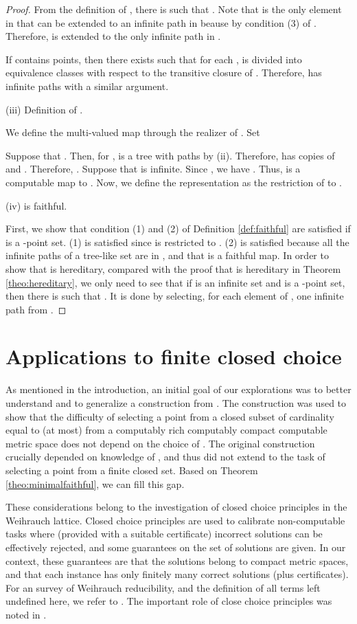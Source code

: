 \documentclass{eptcs-modified}
\begin{document}
\begin{theorem}
\begin{proof}
From the definition of ,  there is  such that .
Note that  is the only element in  that can be extended to an infinite path in 
beause  by condition (3) of .
Therefore,  is extended to the only infinite path in .


If  contains  points, then there exists  such that for each ,
 is divided into  equivalence classes  with respect to the transitive closure of .  Therefore,  has  infinite paths with a similar argument.


(iii) Definition of .

We define the multi-valued map  through  the realizer of .  Set


Suppose that .  Then, for ,   is a tree with  paths by (ii).  Therefore,  has  copies of  and .   Therefore, .
Suppose that  is infinite. Since , we have .
Thus,  is a computable map to .
Now, we define the representation  as the restriction of  to .

(iv)  is faithful.

First, we show that
condition (1) and (2) of  Definition \ref{def:faithful} are satisfied
if  is a -point set.
(1) is satisfied since  is restricted to  .
(2) is satisfied because all the infinite paths of a tree-like set  are in , and
that  is a faithful map.
In order to show that  is hereditary, compared with the proof that
 is hereditary in Theorem \ref{theo:hereditary},
we only need to see that if  is an infinite set and  is a -point set, then there is  such that .
It is done by selecting, for each element of ,  one infinite path from .
\end{proof}
\end{theorem}


\section{Applications to finite closed choice}
\label{sec:weihrauch}
As mentioned in the introduction, an initial goal of our explorations was to better understand and to generalize a construction from \cite{paulyleroux}. The construction was used to show that the difficulty of selecting a point from a closed subset of cardinality equal to (at most)  from a computably rich computably compact computable metric space  does not depend on the choice of . The original construction crucially depended on knowledge of , and thus did not extend to the task of selecting a point from a finite closed set. Based on Theorem \ref{theo:minimalfaithful}, we can fill this gap.

These considerations belong to the investigation of closed choice principles in the Weihrauch lattice. Closed choice principles are used to calibrate non-computable tasks where (provided with a suitable certificate) incorrect solutions can be effectively rejected, and some guarantees on the set of solutions are given. In our context, these guarantees are that the solutions belong to compact metric spaces, and that each instance has only finitely many correct solutions (plus certificates). For an survey of Weihrauch reducibility, and the definition of all terms left undefined here, we refer to \cite{pauly-handbook}. The important role of close choice principles was noted in \cite{paulybrattka}.
\end{document}
